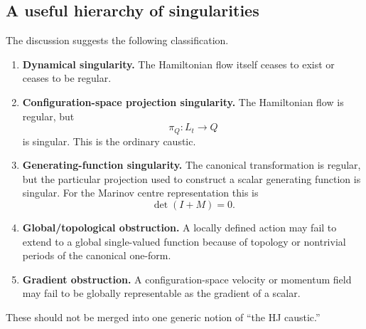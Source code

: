 \subsection{A useful hierarchy of singularities}
The discussion suggests the following classification.
\begin{enumerate}
\item
\textbf{Dynamical singularity.}
The Hamiltonian flow itself ceases to exist or ceases to be regular.
\item
\textbf{Configuration-space projection singularity.}
The Hamiltonian flow is regular, but
\begin{equation}
 \pi_Q:L_t\rightarrow Q
\end{equation}
is singular.  This is the ordinary caustic.
\item
\textbf{Generating-function singularity.}
The canonical transformation is regular, but the particular projection used
to construct a scalar generating function is singular.  For the Marinov
centre representation this is
\begin{equation}
 \det(I+M)=0.
\end{equation}
\item
\textbf{Global/topological obstruction.}
A locally defined action may fail to extend to a global single-valued
function because of topology or nontrivial periods of the canonical
one-form.
\item
\textbf{Gradient obstruction.}
A configuration-space velocity or momentum field may fail to be globally
representable as the gradient of a scalar.
\end{enumerate}
These should not be merged into one generic notion of ``the HJ caustic.''
